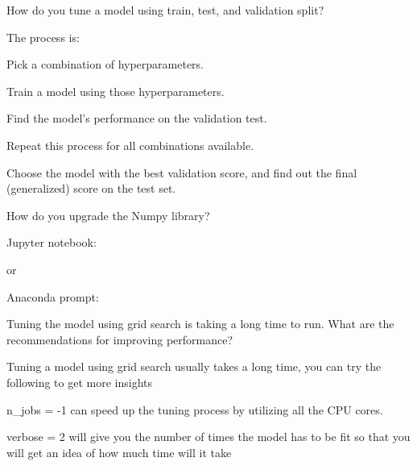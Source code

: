 	\begin{qanda}
		\begin{question}
How do you tune a model using train, test, and validation split?
		\end{question}

		\begin{answer}
The process is:
			\begin{numberedlist}
				\item Pick a combination of hyperparameters.
				\item Train a model using those hyperparameters.
				\item Find the model's performance on the validation test.
				\item Repeat this process for all combinations available.
				\item Choose the model with the best validation score, and find out the final (generalized) score on the test set.
			\end{numberedlist}
		\end{answer}
	\end{qanda}

	\begin{qanda}
		\begin{question}
How do you upgrade the Numpy library?
		\end{question}

		\begin{answer}
 Jupyter notebook: 

\noindent or

\noindent Anaconda prompt: 
		\end{answer}
	\end{qanda}



	\begin{qanda}
		\begin{question}
			Tuning the model using grid search is taking a long time to run. What are the recommendations for improving performance?
		\end{question}

		\begin{answer}
Tuning a model using grid search usually takes a long time, you can try the following to get more insights

\noindent{}

\noindent n\_jobs = -1 can speed up the tuning process by utilizing all the CPU cores.

\noindent verbose = 2 will give you the number of times the model has to be fit so that you will get an idea of how much time will it take
		\end{answer}
	\end{qanda}


